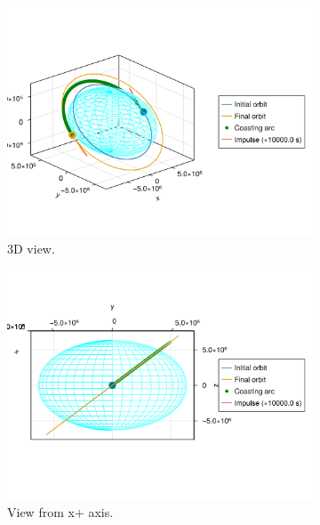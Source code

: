 \begin{figure}[htbp]
    \centering
    \begin{subfigure}{0.49\linewidth}
        \includegraphics[width=\linewidth]{../results/j2/hohmann/CICICIC_3d.png}
        \caption{3D view.}
    \end{subfigure}
    \begin{subfigure}{0.49\linewidth}
        \includegraphics[width=\linewidth]{../results/j2/hohmann/CICICIC_x+.png}
        \caption{View from x+ axis.}
    \end{subfigure}
    \begin{subfigure}{0.49\linewidth}

\end{subfigure}
\end{figure}
